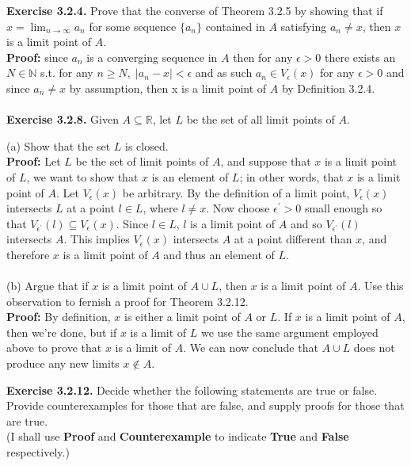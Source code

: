 \documentclass{article}
\begin{document}
\textbf{Exercise 3.2.4.} Prove that the converse of Theorem 3.2.5 by showing that if $x = \lim_{n \to \infty}a_n$ for some sequence $\{ a_n \}$ contained in $A$ satisfying $a_n \neq x$, then $x$ is a limit point of $A$.  \\
\textbf{Proof:} since $a_n$ is a converging sequence in $A$ then for any $\epsilon > 0$ there exists an $N \in \mathbb{N}$ s.t. for any $n \geq N, \; |a_n - x| < \epsilon$ and as such $a_n \in V_\epsilon(x)$ for any $\epsilon > 0$ and since $a_n \neq x$ by assumption, then x is a limit point of $A$ by Definition 3.2.4. \\ \\
\textbf{Exercise 3.2.8.} Given $A \subseteq \mathbb{R}$, let $L$ be the set of all limit points of $A$. 
\begin{itemize}
	(a) Show that the set $L$ is closed. \\
	\textbf{Proof:} Let $L$ be the set of limit points of $A$, and suppose that $x$ is a limit point of $L$, we want to show that $x$ is an element of $L$; in other words, that $x$ is a limit point of $A$. Let $V_\epsilon(x)$ be arbitrary. By the definition of a limit point, $V_\epsilon(x)$ intersects $L$ at a point $l \in L$, where $l \neq x$. Now choose $\epsilon^{'} > 0$ small enough so that $V_{\epsilon^{'}}(l) \subseteq V_\epsilon(x)$. Since $l \in L$, $l$ is a limit point of $A$ and so $V_{\epsilon^{'}}(l)$ intersects $A$. This implies $V_\epsilon(x)$ intersects $A$ at a point different than $x$, and therefore $x$ is a limit point of $A$ and thus an element of $L$.\\ \\
	(b) Argue that if $x$ is a limit point of $A \cup L$, then $x$ is a limit point of $A$. Use this observation to fernish a proof for Theorem 3.2.12. \\
	\textbf{Proof:} By definition, $x$ is either a limit point of $A$ or $L$. If $x$ is a limit point of $A$, then we're done, but if $x$ is a limit of $L$ we use the same argument employed above to prove that $x$ is a limit of $A$. We can now conclude that $A \cup L$ does not produce any new limits $x \notin A$. \\
\end{itemize}
\textbf{Exercise 3.2.12.} Decide whether the following statements are true or false. \\
Provide counterexamples for those that are false, and supply proofs for those that are true. \\
(I shall use \textbf{Proof} and \textbf{Counterexample} to indicate \textbf{True} and \textbf{False} respectively.)  
\end{document}
